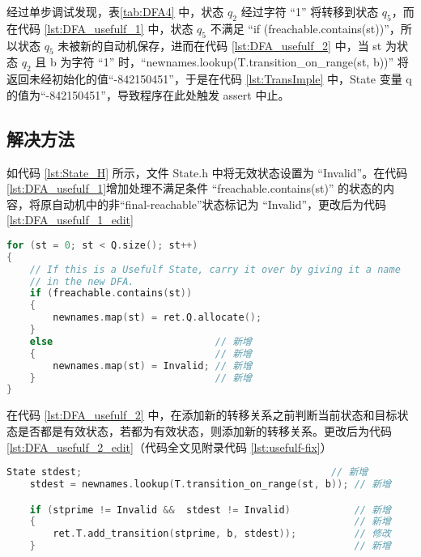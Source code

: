 经过单步调试发现，表\ref{tab:DFA4} 中，状态 $q_2$ 经过字符 “1” 将转移到状态 $q_5$，而在代码 \ref{lst:DFA_usefulf_1} 中，状态 $q_5$ 不满足 “if (freachable.contains(st))”，所以状态 $q_5$ 未被新的自动机保存，进而在代码 \ref{lst:DFA_usefulf_2} 中，当 st 为状态 $q_2$ 且 b 为字符 “1” 时，“newnames.lookup(T.transition\_on\_range(st, b))” 将返回未经初始化的值“-842150451”，于是在代码 \ref{lst:TransImple} 中，State 变量 q 的值为“-842150451”，导致程序在此处触发 assert 中止。

\subsection{解决方法}

如代码 \ref{lst:State_H} 所示，文件 State.h 中将无效状态设置为 “Invalid”。在代码 \ref{lst:DFA_usefulf_1}增加处理不满足条件 “freachable.contains(st)” 的状态的内容，将原自动机中的非“final-reachable”状态标记为 “Invalid”，更改后为代码 \ref{lst:DFA_usefulf_1_edit}

\begin{lstlisting}[language=C++,label={lst:DFA_usefulf_1_edit},caption={ 更改后的 DFA.cpp },firstnumber=91]
for (st = 0; st < Q.size(); st++)
{
    // If this is a Usefulf State, carry it over by giving it a name
    // in the new DFA.
    if (freachable.contains(st))
    {
        newnames.map(st) = ret.Q.allocate();
    }
    else                            // 新增
    {                               // 新增
        newnames.map(st) = Invalid; // 新增
    }                               // 新增
}
\end{lstlisting}

在代码 \ref{lst:DFA_usefulf_2} 中，在添加新的转移关系之前判断当前状态和目标状态是否都是有效状态，若都为有效状态，则添加新的转移关系。更改后为代码 \ref{lst:DFA_usefulf_2_edit}（代码全文见附录代码 \ref{lst:usefulf-fix}）

\begin{lstlisting}[language=C++,label={lst:DFA_usefulf_2_edit},caption={ 更改后的 DFA.cpp },firstnumber=133]
    State stdest;                                           // 新增
    stdest = newnames.lookup(T.transition_on_range(st, b)); // 新增

    if (stprime != Invalid &&  stdest != Invalid)           // 新增
    {                                                       // 新增
        ret.T.add_transition(stprime, b, stdest));          // 修改
    }                                                       // 新增
\end{lstlisting}

